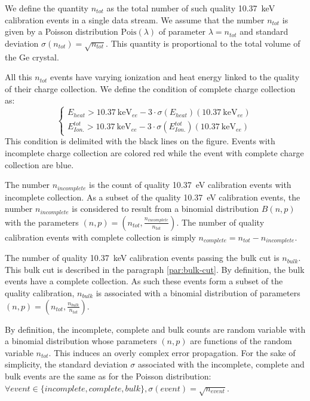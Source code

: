 We define the quantity $n_{tot}$ as the total number of such quality \SI{10.37}{\kilo\eV} calibration events in a single data stream. We assume that the number $n_{tot}$ is given by a Poisson distribution $\mathrm{Pois}(\lambda)$ of parameter $\lambda = n_{tot}$ and standard deviation $\sigma(n_{tot}) = \sqrt{n_{tot}}$. This quantity is proportional to the total volume of the Ge crystal.

All this $n_{tot}$ events have varying ionization and heat energy linked to the quality of their charge collection. We define the condition of complete charge collection as:
\begin{equation}
\begin{cases}
E_{heat} > \SI{10.37}{\kilo\eV_{ee}} - 3 \cdot \sigma(E_{heat})(\SI{10.37}{\kilo\eV_{ee}}) \\
E_{Ion.}^{tot} > \SI{10.37}{\kilo\eV_{ee}} - 3 \cdot \sigma(E_{Ion.}^{tot})(\SI{10.37}{\kilo\eV_{ee}})
\end{cases}
\end{equation}
This condition is delimited with the black lines on the figure. Events with incomplete charge collection are colored red while the event with complete charge collection are blue.

The number $n_{incomplete}$ is the count of quality \SI{10.37}{\eV} calibration events with incomplete collection. As a subset of the quality \SI{10.37}{\eV} calibration events, the number $n_{incomplete}$ is considered to result from a binomial distribution $B(n, p)$ with the parameters $(n,p) = (n_{tot}, \frac{n_{incomplete}}{n_{tot}})$. The number of quality calibration events with complete collection is simply $n_{complete} = n_{tot} - n_{incomplete}$.

The number of quality \SI{10.37}{\kilo\eV} calibration events passing the bulk cut is $n_{bulk}$. This bulk cut is described in the paragraph \ref{par:bulk-cut}. By definition, the bulk events have a complete collection. As such these events form a subset of the quality calibration, $n_{bulk}$ is associated with a binomial distribution of parameters $(n,p) = (n_{tot}, \frac{n_{bulk}}{n_{tot}})$.

By definition, the incomplete, complete and bulk counts are random variable with a binomial distribution whose parameters $(n,p)$ are functions of the random variable $n_{tot}$. This induces an overly complex error propagation. For the sake of simplicity, the standard deviation $\sigma$ associated with the incomplete, complete and bulk events are the same as for the Poisson distribution: $\forall event \in \{ incomplete, complete, bulk \}, \sigma (event) = \sqrt{n_{event}}$.


